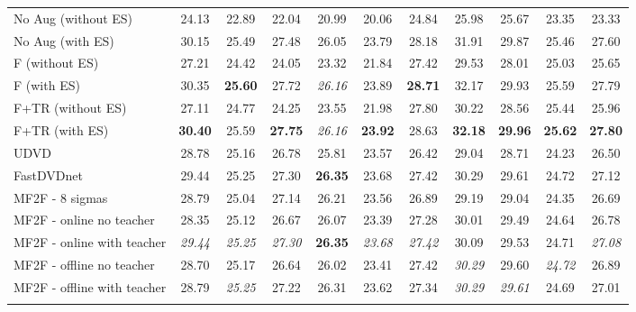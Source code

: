 \documentclass[final]{cvpr}
\begin{document}
\begin{table*}[ht]
{\begin{tabular}{lcccccccccc}
        No Aug \hfill(without ES)  & 24.13 & 22.89 & 22.04 & 20.99 & 20.06 & 24.84 & 25.98 & 25.67 & 23.35 & 23.33 \\
        No Aug  \hfill(with ES)                & 30.15 & 25.49 & 27.48 & 26.05 & 23.79 & 28.18 & 31.91 & 29.87 & 25.46 & 27.60 \\
        F \hfill(without ES)       & 27.21 & 24.42 & 24.05 & 23.32 & 21.84 & 27.42 & 29.53 & 28.01 & 25.03 & 25.65 \\
        F  \hfill(with ES)   & 30.35 & \textbf{25.60} & 27.72 & \textit{26.16} & 23.89 & \textbf{28.71} & 32.17 & 29.93 & 25.59 & 27.79 \\
        F+TR \hfill(without ES)    & 27.11 & 24.77 & 24.25 & 23.55 & 21.98 & 27.80 & 30.22 & 28.56 & 25.44 & 25.96 \\
        F+TR  \hfill(with ES)   & \textbf{30.40} & 25.59 & \textbf{27.75} & \textit{26.16} & \textbf{23.92} & 28.63 & \textbf{32.18} & \textbf{29.96} & \textbf{25.62} & \textbf{27.80} \\
        \midrule
        UDVD        & 28.78 & 25.16 & 26.78 & 25.81 & 23.57 & 26.42 & 29.04 & 28.71 & 24.23 & 26.50 \\
        FastDVDnet  & 29.44 & 25.25 & 27.30 & \textbf{26.35} & 23.68 & 27.42 & 30.29 & 29.61 & 24.72 & 27.12 \\
        \midrule
        MF2F - 8 sigmas               & 28.79 & 25.04 & 27.14 & 26.21 & 23.56 & 26.89 & 29.19 & 29.04 & 24.35 & 26.69 \\
        MF2F - online no teacher      & 28.35 & 25.12 & 26.67 & 26.07 & 23.39 & 27.28 & 30.01 & 29.49 & 24.64 & 26.78 \\
        MF2F - online with teacher    & \textit{29.44} & \textit{25.25} & \textit{27.30} & \textbf{26.35} & \textit{23.68} & \textit{27.42} & 30.09 & 29.53 & 24.71 & \textit{27.08} \\
        MF2F - offline no teacher     & 28.70 & 25.17 & 26.64 & 26.02 & 23.41 & 27.42 & \textit{30.29} & 29.60 & \textit{24.72} & 26.89 \\
        MF2F - offline with teacher   & 28.79 & \textit{25.25} & 27.22 & 26.31 & 23.62 & 27.34 & \textit{30.29} & \textit{29.61} & 24.69 & 27.01 \\
        \bottomrule \\
    \end{tabular}
    }

\end{table*}
\end{document}
